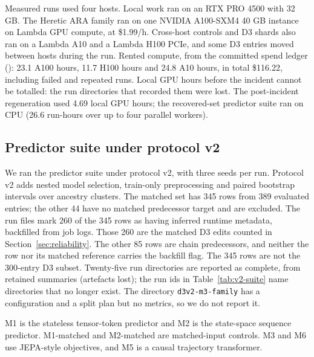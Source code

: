 Measured runs used four hosts. Local work ran on an RTX PRO 4500 with 32 GB. The Heretic ARA family ran on one NVIDIA A100-SXM4 40 GB instance on Lambda GPU compute, at \$1.99/h. Cross-host controls and D3 shards also ran on a Lambda A10 and a Lambda H100 PCIe, and some D3 entries moved between hosts during the run. Rented compute, from the committed spend ledger (): 23.1 A100 hours, 11.7 H100 hours and 24.8 A10 hours, in total \$116.22, including failed and repeated runs. Local GPU hours before the incident cannot be totalled: the run directories that recorded them were lost. The post-incident regeneration used 4.69 local GPU hours; the recovered-set predictor suite ran on CPU (26.6 run-hours over up to four parallel workers).



\subsection{Predictor suite under protocol v2}
\label{sec:v2}
We ran the predictor suite under protocol v2, with three seeds per run. Protocol v2 adds nested model selection, train-only preprocessing and paired bootstrap intervals over ancestry clusters. The matched set has 345 rows from 389 evaluated entries; the other 44 have no matched predecessor target and are excluded. The run files mark 260 of the 345 rows as having inferred runtime metadata, backfilled from job logs. Those 260 are the matched D3 edits counted in Section~\ref{sec:reliability}. The other 85 rows are chain predecessors, and neither the row nor its matched reference carries the backfill flag. The 345 rows are not the 300-entry D3 subset. Twenty-five run directories are reported as complete, from retained summaries (artefacts lost); the run ids in Table~\ref{tab:v2-suite} name directories that no longer exist. The directory \texttt{d3v2-m3-family} has a configuration and a split plan but no metrics, so we do not report it.

M1 is the stateless tensor-token predictor and M2 is the state-space sequence predictor. M1-matched and M2-matched are matched-input controls. M3 and M6 use JEPA-style objectives, and M5 is a causal trajectory transformer.

